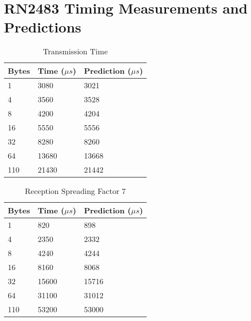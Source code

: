 \section{RN2483 Timing Measurements and Predictions}

\begin{table}[H]
\centering
\begin{tabular}{@{}lll@{}}
\toprule
\multicolumn{1}{|c|}{\cellcolor[HTML]{C0C0C0}Bytes} & Time ($\mu s$) & Prediction ($\mu s$) \\ \midrule
1                                                   & 3080      & 3021       \\
4                                                   & 3560      & 3528       \\
8                                                   & 4200      & 4204       \\
16                                                  & 5550      & 5556       \\
32                                                  & 8280      & 8260       \\
64                                                  & 13680     & 13668      \\
110                                                 & 21430     & 21442      \\ \bottomrule
\end{tabular}
\caption{Transmission Time\label{table:measurementtx}}
\end{table}

\begin{table}[H]
\centering
\begin{tabular}{@{}lll@{}}
\toprule
\multicolumn{1}{|c|}{\cellcolor[HTML]{C0C0C0}Bytes} & Time ($\mu s$) & Prediction ($\mu s$) \\ \midrule
1                                                   & 820       & 898        \\
4                                                   & 2350      & 2332       \\
8                                                   & 4240      & 4244       \\
16                                                  & 8160      & 8068       \\
32                                                  & 15600     & 15716      \\
64                                                  & 31100     & 31012      \\
110                                                 & 53200     & 53000      \\ \bottomrule
\end{tabular}
\caption{Reception Spreading Factor 7\label{table:rxsf7}}
\end{table}

